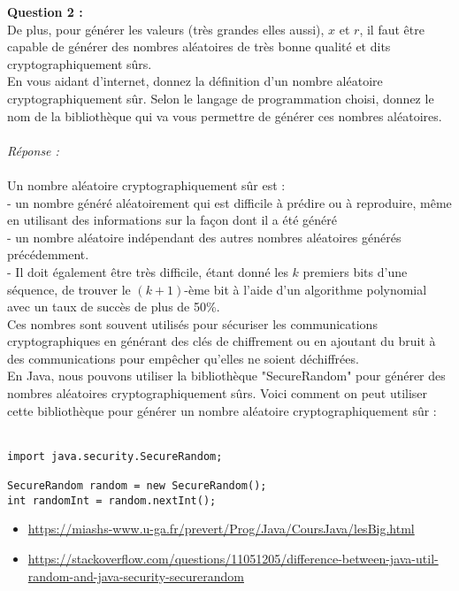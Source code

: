 \documentclass[a4paper,11pt]{article}
\begin{document}
        \label{subsec:Q2}
        \textbf{Question 2 : \\}De plus, pour générer les valeurs (très grandes elles aussi), $x$ et $r$, il faut être capable de générer des nombres aléatoires de très bonne qualité et dits cryptographiquement sûrs.\\En vous aidant d’internet, donnez la définition d’un nombre aléatoire cryptographiquement sûr. Selon le langage de programmation choisi, donnez le nom de la bibliothèque qui va vous permettre de générer ces nombres aléatoires.\\ \textit{\\Réponse :}\\\\Un nombre aléatoire cryptographiquement sûr est :\\ - un nombre généré aléatoirement qui est difficile à prédire ou à reproduire, même en utilisant des informations sur la façon dont il a été généré\\ - un nombre aléatoire indépendant des autres nombres aléatoires générés précédemment.\\ - Il doit également être très difficile, étant donné les $k$ premiers bits d'une séquence, de trouver le $(k+1)$-ème bit à l'aide d'un algorithme polynomial avec un taux de succès de plus de 50\%.\\ Ces nombres sont souvent utilisés pour sécuriser les communications cryptographiques en générant des clés de chiffrement ou en ajoutant du bruit à des communications pour empêcher qu'elles ne soient déchiffrées.\\
En Java, nous pouvons utiliser la bibliothèque "SecureRandom" pour générer des nombres aléatoires cryptographiquement sûrs. Voici comment on peut utiliser cette bibliothèque pour générer un nombre aléatoire cryptographiquement sûr :\\\\ \begin{lstlisting}
import java.security.SecureRandom;

SecureRandom random = new SecureRandom();
int randomInt = random.nextInt();

\end{lstlisting}
\begin{itemize}
    \item \url{https://miashs-www.u-ga.fr/prevert/Prog/Java/CoursJava/lesBig.html}
    \item \url{https://stackoverflow.com/questions/11051205/difference-between-java-util-random-and-java-security-securerandom}
\end{itemize}
\end{document}

